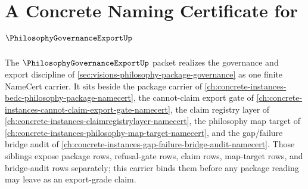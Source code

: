 \chapter{A Concrete Naming Certificate for $\PhilosophyGovernanceExportUp$}
\label{ch:concrete-instances-philosophy-governance-export-namecert}

The $\PhilosophyGovernanceExportUp$ packet realizes the governance and export discipline of \autoref{sec:visions-philosophy-package-governance} as one finite NameCert carrier. It sits beside the package carrier of \autoref{ch:concrete-instances-bedc-philosophy-package-namecert}, the cannot-claim export gate of \autoref{ch:concrete-instances-cannot-claim-export-gate-namecert}, the claim registry layer of \autoref{ch:concrete-instances-claimregistrylayer-namecert}, the philosophy map target of \autoref{ch:concrete-instances-philosophy-map-target-namecert}, and the gap/failure bridge audit of \autoref{ch:concrete-instances-gap-failure-bridge-audit-namecert}. Those siblings expose package rows, refusal-gate rows, claim rows, map-target rows, and bridge-audit rows separately; this carrier binds them before any package reading may leave as an export-grade claim.

